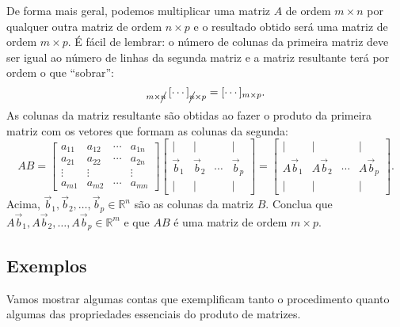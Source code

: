 \documentclass[../livro.tex]{subfiles}  %
\begin{document}
De forma mais geral, podemos multiplicar uma matriz $A$ de ordem $m \times n$ por qualquer outra matriz de ordem $n \times p$ e o resultado obtido será uma matriz de ordem $m \times p$. É fácil de lembrar: o número de colunas da primeira matriz deve ser igual ao número de linhas da segunda matriz e a matriz resultante terá por ordem o que  ``sobrar'':
\begin{equation}
[\cdots]_{m \times \cancel{n}} \, [\cdots]_{\cancel{n} \times p} = [\cdots]_{m \times p}.
\end{equation} As colunas da matriz resultante são obtidas ao fazer o produto da primeira matriz com os vetores que formam as colunas da segunda:
\begin{equation}
A B =
\left[
\begin{array}{cccc}
a_{11} & a_{12} & \cdots & a_{1n} \\
a_{21} & a_{22} & \cdots & a_{2n} \\
\vdots & \vdots &        & \vdots \\
a_{m1} & a_{m2} & \cdots & a_{mn} 
\end{array}
\right]
\left[
\begin{array}{cccc}
| & |  &   & | \\
\vec{b}_{1} & \vec{b}_{2} & \cdots & \vec{b}_{p} \\
| & |  &   & | 
\end{array}
\right] =
\left[
\begin{array}{cccc}
| & |  &   & | \\
A\vec{b}_{1} & A\vec{b}_{2} & \cdots & A\vec{b}_{p} \\
| & |  &   & | 
\end{array}
\right].
\end{equation} Acima, $\vec{b}_{1}, \vec{b}_{2}, \dots, \vec{b}_{p} \in \mathbb{R}^n$ são as colunas da matriz $B$. Conclua que $A\vec{b}_{1}, A\vec{b}_{2}, \dots, A\vec{b}_{p} \in \mathbb{R}^m$ e que $AB$ é uma matriz de ordem $m \times p$.

\subsection{Exemplos}

Vamos mostrar algumas contas que exemplificam tanto o procedimento quanto algumas das propriedades essenciais do produto de matrizes.
\end{document}
